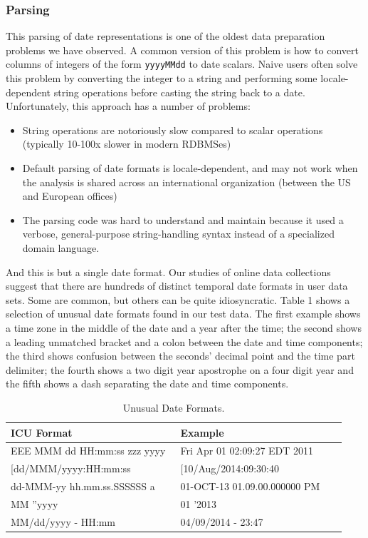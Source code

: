\subsubsection{Parsing}
This parsing of date representations is one of the oldest data preparation problems we have observed. A common version of this problem is how to convert columns of integers of the form \texttt{yyyyMMdd} to date scalars. Naive users often solve this problem by converting the integer to a string and performing some locale-dependent string operations before casting the string back to a date. Unfortunately, this approach has a number of problems:
\begin{itemize}
\item String operations are notoriously slow compared to scalar operations (typically 10-100x slower in modern RDBMSes)
\item Default parsing of date formats is locale-dependent, and may not work when the analysis is shared across an international organization (\eg between the US and European offices)
\item The parsing code was hard to understand and maintain because it used a verbose, general-purpose string-handling syntax instead of a specialized domain language.
\end{itemize}

And this is but a single date format. Our studies of online data collections suggest that there are hundreds of distinct temporal date formats in user data sets. Some are common, but others can be quite idiosyncratic. Table 1 shows a selection of unusual date formats found in our test data. The first example shows a time zone in the middle of the date and a year after the time; the second shows a leading unmatched bracket and a colon between the date and time components; the third shows confusion between the seconds' decimal point and the time part delimiter; the fourth shows a two digit year apostrophe on a four digit year and the fifth shows a dash separating the date and time components.



\begin{table}[ht]
\centering
\begin{tabular}{|p{0.498\linewidth}| p{0.485\linewidth}|}
\hline
\centering
\textbf{ICU Format} & \textbf{Example}\\ \hline
\scriptsize{EEE MMM dd HH:mm:ss zzz yyyy} & \scriptsize{Fri Apr 01 02:09:27 EDT 2011}\\ \hline
\scriptsize{[dd/MMM/yyyy:HH:mm:ss} & \scriptsize{[10/Aug/2014:09:30:40}\\ \hline
\scriptsize{dd-MMM-yy hh.mm.ss.SSSSSS a} & \scriptsize{01-OCT-13 01.09.00.000000 PM}\\ \hline
\scriptsize{MM ''yyyy} & \scriptsize{01 '2013}\\ \hline
\scriptsize{MM/dd/yyyy - HH:mm} & \scriptsize{04/09/2014 - 23:47}\\ \hline
\end{tabular}
\label{tab:dateformats}
\caption{Unusual Date Formats.}
\end{table}


